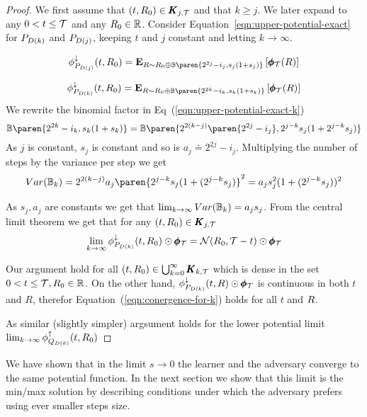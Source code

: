 \documentclass[anon,12pt]{colt2024} %
\begin{document}
\begin{proof}

We first assume that $(t,R_0) \in \pmb{K}_{j,\mathcal{T}}$ and that $k\geq j$. We later expand to any $0 < t \leq \mathcal{T}$ and any $R_0 \in \mathbb{R}$.
Consider Equation~\ref{eqn:upper-potential-exact} for $P_{D(k)}$ and $P_{D(j)}$,
keeping $t$ and $j$ constant and letting $k \to \infty$.

\begin{equation} \label{eqn:upper-potential-exact-j}
  \upperpotMdj(t,\R_0) =  \E{\R \sim \R_0 \oplus
    \Binom\paren{2^{2j}-i_j,s_j(1+s_j)}}{\finalPotR(\R)}
\end{equation}

\begin{equation} \label{eqn:upper-potential-exact-k}
  \upperpotMdk(t,\R_0) =  \E{\R \sim \R_0 \oplus
    \Binom\paren{2^{2k}-i_k,s_k(1+s_k)}}{\finalPotR(\R)}
\end{equation}
We rewrite the binomial factor in
Eq~(\ref{eqn:upper-potential-exact-k})
$$
 \Binom\paren{2^{2k}-i_k,s_k(1+s_k)} =
 \Binom\paren{2^{2(k-j)}\paren{2^{2j}-i_j},2^{j-k} s_j(1+2^{j-k} s_j)}
 $$
As $j$ is constant, $s_j$ is constant and so is $a_j \doteq
2^{2j}-i_j$. Multiplying the number of steps by the variance per step
we get
$$Var(\Binom_k) = 2^{2(k-j)}a_j\paren{2^{j-k} s_j(1+(2^{j-k} s_j)}^2
= a_j s_j^2 (1+(2^{j-k} s_j))^2 
$$

As $s_j,a_j$ are constants we get that $\lim_{k \to \infty}
Var(\mathbb{B}_k) = a_j s_j$.  From the central limit theorem we get that
for any $(t,R_0) \in \pmb{K}_{j,\mathcal{T}}$
\begin{equation} \label{eqn:conergence-for-k}
  \lim_{k \to \infty} \phi_{P_{D(k)}}^{\downarrow}(t,R_0) \odot \pmb{\phi}_{\mathcal{T}} = {\cal
    N}(R_0,\mathcal{T}-t) \odot \pmb{\phi}_{\mathcal{T}}
\end{equation}

Our argument hold for all $(t,R_0) \in \bigcup_{k=0}^\infty \pmb{K}_{k,\mathcal{T}}$ which is dense in the set $0<t\leq \mathcal{T}, R_0 \in \mathbb{R}$.
On the other hand, $\phi_{P_{D(k)}}^{\downarrow}(t,R) \odot \pmb{\phi}_{\mathcal{T}}$ is continuous in both
$t$ and $R$, therefor Equation~(\ref{eqn:conergence-for-k})  holds for all $t$ and $R$.

As similar (slightly simpler) argsument holds for the lower potential limit
$\lim_{k \to \infty} \phi_{Q_{D(k)}}^{\uparrow}(t,R_0)$

\end{proof}

We have shown that in the limit $s \to 0$ the learner and the
adversary converge to the same potential function. In the next section
we show that this limit is the min/max solution by describing conditions
under which the adversary prefers using ever smaller steps size.
\end{document}
